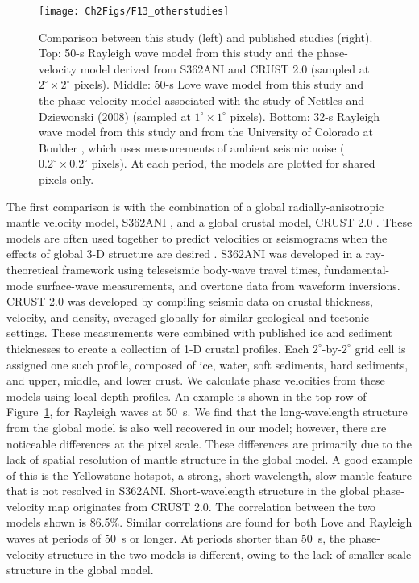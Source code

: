 \documentclass[12pt,oneside]{book}
\newcommand{\degree}[1]{\mbox{$#1^{\circ}$}}
\begin{document}
\begin{figure}
\begin{center}
\texttt{[image: Ch2Figs/F13\_otherstudies]} 
\caption[Comparison of phase-velocity maps from this study and other published studies]{Comparison between this study (left) and published studies (right). Top: 50-s Rayleigh wave model from this study and the phase-velocity model derived from S362ANI and CRUST 2.0 (sampled at $\degree{2}\times\degree{2}$ pixels). Middle: 50-s Love wave model from this study and the phase-velocity model associated with the study of Nettles and Dziewonski (2008) (sampled at $\degree{1}\times\degree{1}$ pixels). Bottom: 32-s Rayleigh wave model from this study and from the University of Colorado at Boulder \citep{Lin2009}, which uses measurements of ambient seismic noise ($\degree{0.2}\times\degree{0.2}$ pixels). At each period, the models are plotted for shared pixels only. }
\label{figpv:Otherstudies}
\end{center}
\end{figure}
%

The first comparison is with the combination of a global radially-anisotropic mantle velocity model, S362ANI \citep{Kustowskietal2008}, and a global crustal model, CRUST 2.0 \citep{CRUST2}. These models are often used together to predict velocities or seismograms when the effects of global 3\nobreakdash-D structure are desired \citep[e.g.,][]{Tromp2010}. S362ANI was developed in a ray-theoretical framework using teleseismic body-wave travel times, fundamental-mode surface-wave measurements, and overtone data from waveform inversions. CRUST 2.0 was developed by compiling seismic data on crustal thickness, velocity, and density, averaged globally for similar geological and tectonic settings. These measurements were combined with published ice and sediment thicknesses to create a collection of 1\nobreakdash-D crustal profiles. Each \degree{2}\nobreakdash-by\nobreakdash-\degree{2} grid cell is assigned one such profile, composed of ice, water, soft sediments, hard sediments, and upper, middle, and lower crust. We calculate phase velocities from these models using local depth profiles. An example is shown in the top row of Figure~\ref{figpv:Otherstudies}, for Rayleigh waves at 50~s. We find that the long-wavelength structure from the global model is also well recovered in our model; however, there are noticeable differences at the pixel scale. These differences are primarily due to the lack of spatial resolution of mantle structure in the global model. A good example of this is the Yellowstone hotspot, a strong, short-wavelength, slow mantle feature that is not resolved in S362ANI. Short-wavelength structure in the global phase-velocity map originates from CRUST 2.0. The correlation between the two models shown is 86.5\%. Similar correlations are found for both Love and Rayleigh waves at periods of 50~s or longer. At periods shorter than 50~s, the phase-velocity structure in the two models is different, owing to the lack of smaller-scale structure in the global model. 
\end{document}
